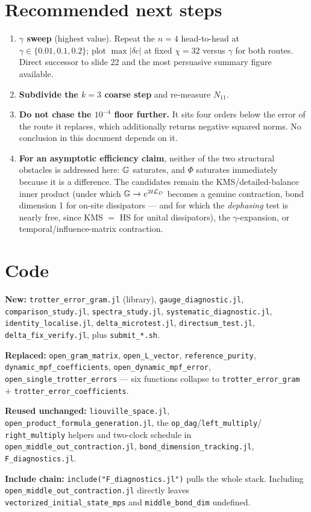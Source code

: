 \documentclass[11pt,a4paper]{article}
\begin{document}
\section{Recommended next steps}
\begin{enumerate}
\item\textbf{$\gamma$ sweep} (highest value). Repeat the $n=4$ head-to-head at
$\gamma\in\{0.01,0.1,0.2\}$; plot $\max|\delta c|$ at fixed $\chi=32$ versus $\gamma$ for both
routes. Direct successor to slide 22 and the most persuasive summary figure available.
\item\textbf{Subdivide the $k=3$ coarse step} and re-measure $N_{11}$.
\item\textbf{Do not chase the $10^{-4}$ floor further.} It sits four orders below the error of
the route it replaces, which additionally returns negative squared norms. No conclusion in this
document depends on it.
\item\textbf{For an asymptotic efficiency claim}, neither of the two structural obstacles is
addressed here: $\mathbb{G}$ saturates, and $\Phi$ saturates immediately because it is a difference.
The candidates remain the KMS/detailed-balance inner product (under which
$\mathbb{G}\to e^{2t\mathcal{L}_D}$ becomes a genuine contraction, bond dimension 1 for on-site
dissipators --- and for which the \emph{dephasing} test is nearly free, since KMS $=$ HS for
unital dissipators), the $\gamma$-expansion, or temporal/influence-matrix contraction.
\end{enumerate}

\section{Code}
\textbf{New:} \texttt{trotter\_error\_gram.jl} (library), \texttt{gauge\_diagnostic.jl},
\texttt{comparison\_study.jl}, \texttt{spectra\_study.jl}, \texttt{systematic\_diagnostic.jl},
\texttt{identity\_localise.jl}, \texttt{delta\_microtest.jl}, \texttt{directsum\_test.jl},
\texttt{delta\_fix\_verify.jl}, plus \texttt{submit\_*.sh}.

\textbf{Replaced:} \texttt{open\_gram\_matrix}, \texttt{open\_L\_vector},
\texttt{reference\_purity}, \texttt{dynamic\_mpf\_coefficients},
\texttt{open\_dynamic\_mpf\_error}, \texttt{open\_single\_trotter\_errors} --- six functions
collapse to \texttt{trotter\_error\_gram} $+$ \texttt{trotter\_error\_coefficients}.

\textbf{Reused unchanged:} \texttt{liouville\_space.jl},
\texttt{open\_product\_formula\_generation.jl}, the \texttt{op\_dag}/\texttt{left\_multiply}/
\texttt{right\_multiply} helpers and two-clock schedule in
\texttt{open\_middle\_out\_contraction.jl}, \texttt{bond\_dimension\_tracking.jl},
\texttt{F\_diagnostics.jl}.

\textbf{Include chain:} \texttt{include("F\_diagnostics.jl")} pulls the whole stack. Including
\texttt{open\_middle\_out\_contraction.jl} directly leaves
\texttt{vectorized\_initial\_state\_mps} and \texttt{middle\_bond\_dim} undefined.
\end{document}
